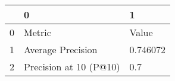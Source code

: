 \begin{tabular}{lll}
\toprule
{} &                       0 &         1 \\
\midrule
0 &                  Metric &     Value \\
1 &       Average Precision &  0.746072 \\
2 &  Precision at 10 (P@10) &       0.7 \\
\bottomrule
\end{tabular}
